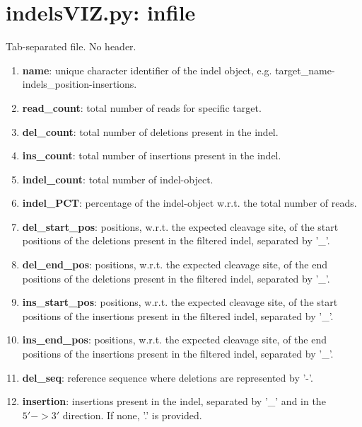 \documentclass[11pt, twoside]{article}
\begin{document}
\newpage
\section{indelsVIZ.py: infile}

Tab-separated file. No header.

\begin{enumerate}
\item {\bf name}: unique character identifier of the indel object,
  e.g. target\_name-indels\_position-insertions.

\item {\bf read_count}: total number of reads for specific target.

\item {\bf del_count}: total number of deletions present in the indel.

\item {\bf ins_count}: total number of insertions present in the indel.

\item {\bf indel_count}: total number of indel-object.

\item {\bf indel_PCT}: percentage of the indel-object w.r.t. the total number of reads.

\item {\bf del_start_pos}: positions, w.r.t. the expected cleavage site,
  of the start positions of the deletions present in the filtered indel, separated by '\_'.

\item {\bf del_end_pos}: positions, w.r.t. the expected cleavage site,
  of the end positions of the deletions present in the filtered indel, separated by '\_'.

\item {\bf ins_start_pos}: positions, w.r.t. the expected cleavage site,
  of the start positions of the insertions present in the filtered indel, separated by '\_'.

\item {\bf ins_end_pos}: positions, w.r.t. the expected cleavage site,
  of the end positions of the insertions present in the filtered indel, separated by '\_'.

\item {\bf del_seq}: reference sequence where deletions are represented by '-'.

\item {\bf insertion}: insertions present in the indel, separated by '\_' and in the $5' -> 3'$ direction.
  If none, '.' is provided.
\end{enumerate}


\end{document}
